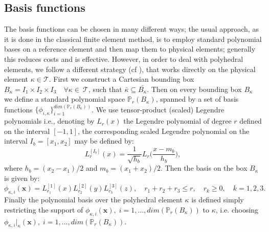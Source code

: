 \documentclass[12pt, a4paper]{article}
\theoremstyle{definition}
\theoremstyle{plain}
\theoremstyle{plain}
\theoremstyle{definition}
\begin{document}
\subsection{Basis functions}
The basis functions can be chosen in many different ways; the usual approach, 
as it is done in the classical finite element method, is to employ standard 
polynomial bases on a reference element and then map them to physical elements; 
generally this reduces costs and is effective. However, in order to deal with 
polyhedral elements, we follow a different strategy (cf \cite{hpmet}), that 
works directly on the physical element $\kappa \in \mathcal{T}$. First we 
construct a Cartesian bounding box $B_\kappa=I_1\times I_2 \times 
I_3 \quad \forall\kappa\in~\mathcal{T} $, such that $\bar{\kappa} \subseteq 
\bar{B_\kappa}$. Then on every bounding box $B_\kappa$ we define a standard 
polynomial space $\mathbb{P}_r(B_\kappa)$, spanned by a set of basis functions 
$\{ \phi_{i,\kappa} \}_{i=1}^{dim(\mathbb{P}_r(B_\kappa))}$. We use 
tensor-product (scaled) Legendre polynomials i.e., denoting by $L_r(x)$ the 
Legendre polynomial of degree $r$ defined on the interval $[-1, 1]$, the 
corresponding scaled Legendre polynomial on the interval $I_b = [x_1, x_2]$ may 
be defined by:
\begin{equation*}
	L_r^{[I_b]} (x) = \frac{1}{\sqrt{h_b}} L_r \bigg( \frac{x-m_b}{h_b} \bigg),
\end{equation*}
where $h_b = (x_2-x_1)/2$ and $m_b = (x_1+x_2)/2$. Then the basis on the box 
$B_\kappa$ is given by:
\begin{equation*}
\phi_{\kappa,i}(\mathbf{x}) = L_{r_1}^{[1]}(x)L_{r_2}^{[2]}(y)L_{r_3}^{[3]}(z), \quad
r_1+r_2+r_3 \leq r, \quad r_k \geq 0, \quad k = 1,2,3.
\end{equation*}
Finally the polynomial basis over the polyhedral element $\kappa$ is defined simply restricting the support of $\phi_{\kappa, i}(\mathbf{x}), \; i=1,\dots,dim(\mathbb{P}_r(B_\kappa))$ to $\kappa$, i.e. choosing  $\phi_{\kappa, i}|_\kappa (\mathbf{x}), \; i=1,\dots,dim(\mathbb{P}_r(B_\kappa))$.
\end{document}
